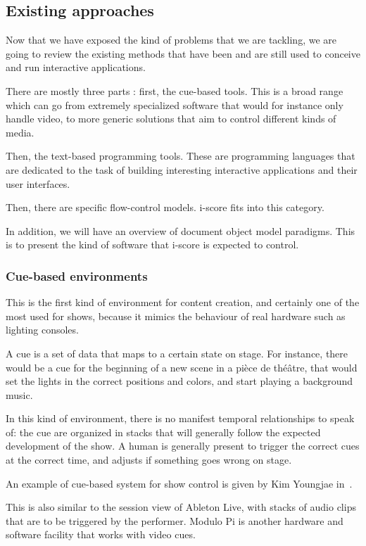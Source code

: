 \documentclass{sigchi}
\begin{document}
\subsection{Existing approaches}
Now that we have exposed the kind of problems that we are tackling, we are going to review the existing methods that have been and are still used to conceive and run interactive applications.

There are mostly three parts : first, the cue-based tools. This is a broad range which can go from extremely specialized software that would for instance only handle video, to more generic solutions that aim to control different kinds of media.

Then, the text-based programming tools. These are programming languages that are dedicated to the task of building interesting interactive applications and their user interfaces.

Then, there are specific flow-control models. i-score fits into this category.

In addition, we will have an overview of document object model paradigms. This is to present the kind of software that i-score is expected to control. %

\subsubsection{Cue-based environments}
This is the first kind of environment for content creation, and certainly one of the most used for shows, because it mimics the behaviour of real hardware such as lighting consoles.

A cue is a set of data that maps to a certain state on stage. For instance, there would be a cue for the beginning of a new scene in a pièce de théâtre, that would set the lights in the correct positions and colors, and start playing a background music.

In this kind of environment, there is no manifest temporal relationships to speak of: the cue are organized in stacks that will generally follow the expected development of the show. A human is generally present to trigger the correct cues at the correct time, and adjusts if something goes wrong on stage.

An example of cue-based system for show control is given by Kim Youngjae in~\cite{kim_unified_2013}. 

This is also similar to the session view of Ableton Live, with stacks of audio clips that are to be triggered by the performer. Modulo Pi is another hardware and software facility that works with video cues.
\end{document}
